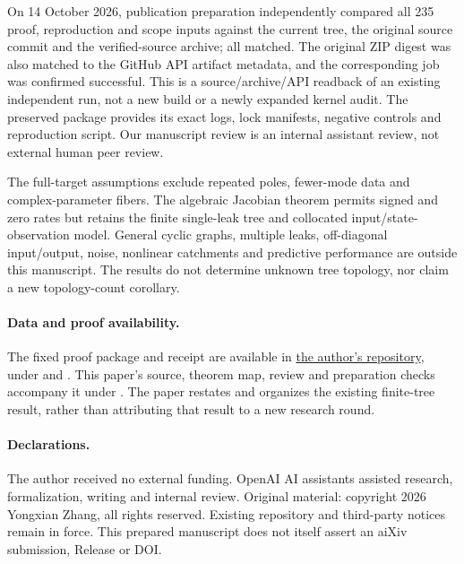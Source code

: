 \documentclass[11pt]{article}
\theoremstyle{remark}
\newcommand{\1}{\mathbf 1}
\begin{document}
On 14 October 2026, publication preparation independently compared all
235 proof, reproduction and scope inputs against the current tree, the
original source commit and the verified-source archive; all matched.
The original ZIP digest was also matched to the GitHub API artifact
metadata, and the corresponding job was confirmed successful.
This is a source/archive/API readback of an existing independent run,
not a new build or a newly expanded kernel audit.
The preserved package provides its exact logs, lock manifests, negative
controls and reproduction script. Our manuscript review is an internal
assistant review, not external human peer review.

The full-target assumptions exclude repeated poles, fewer-mode data and
complex-parameter fibers. The algebraic Jacobian theorem permits signed
and zero rates but retains the finite single-leak tree and collocated
input/state-observation model. General cyclic graphs, multiple leaks,
off-diagonal input/output, noise, nonlinear catchments and predictive
performance are outside this manuscript. The results do not determine
unknown tree topology, nor claim a new topology-count corollary.

\clearpage
\begin{samepage}
\paragraph{Data and proof availability.}
The fixed proof package and receipt are available in
\href{https://github.com/mxym/math}{the author's repository}, under
 and
.
This paper's source, theorem map, review and preparation checks accompany
it under .
The paper restates and organizes the existing finite-tree result, rather
than attributing that result to a new research round.
\end{samepage}

\paragraph{Declarations.}
The author received no external funding. OpenAI AI assistants assisted
research, formalization, writing and internal review. Original material:
copyright 2026 Yongxian Zhang, all rights reserved. Existing repository
and third-party notices remain in force. This prepared manuscript does
not itself assert an aiXiv submission, Release or DOI.
\end{document}
